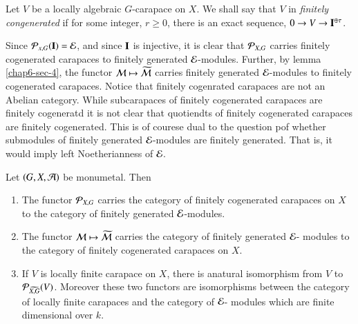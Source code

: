 \setcounter{definition}{5}
\begin{definition}\label{chap6-definition-15.6}
Let $V$ be a locally algebraic $G$-carapace on $X$. We shall say that $V$ in \textit{finitely congenerated} if for some integer, $r \geq 0$, there is an exact sequence, $0 \rightarrow V \rightarrow \mathbf{I}^{\oplus \tau}$.
\end{definition}

Since $\mathcal{P}_{x, G}(\mathbf{I}) =\mathcal{E}$, and since $\mathbf{I}$ is injective, it is clear that $\mathcal{P}_{X, G}$ carries finitely cogenerated carapaces to finitely generated $\mathcal{E}$-modules. Further, by lemma \ref{chap6-sec-4}, the functor
$\mathcal{M} \mapsto \widetilde{\mathcal{M}}$ carries finitely generated $\mathcal{E}$-modules to finitely  cogenerated carapaces. Notice that finitely cogenrated carapaces are not an Abelian category. While subcarapaces of finitely cogenerated carapaces are finitely cogeneratd it is not clear that quotiendts of finitely cogenerated carapaces are finitely cogenerated. This is of courese dual to the question pof whether submodules of finitely generated $\mathcal{E}$-modules are finitely generated. That is, it would imply left Noetherianness of $\mathcal{E}$.

\begin{secthm}\label{chap6-thm-15.7}
Let $(G, X, \mathcal{A})$ be monumetal. Then
\begin{enumerate}[(1)]
\item The functor $\mathcal{P}_{X, G}$ carries the category of finitely cogenerated carapaces on $X$ to the category of finitely generated $\mathcal{E}$-modules.\label{chap6-thm15.7-enum-1}

\item The functor $\mathcal{M} \mapsto \widetilde{\mathcal{M}}$ carries the category of finitely generated $\mathcal{E}$- modules to the category of finitely cogenerated carapaces on $X$.\label{chap6-thm15.7-enum-2}

\item If $V$ is locally finite carapace on $X$, there is anatural isomorphism from $V$ to $\mathcal{P}_{\widetilde{X,G}}(V)$. Moreover these two functors are isomorphisms between the category of locally finite carapaces and the category of $\mathcal{E}$- modules which are finite dimensional over $k$.\label{chap6-thm15.7-enum-3}
\end{enumerate}
\end{secthm}

